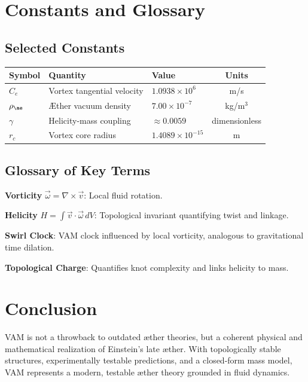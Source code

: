 \documentclass[12pt]{article}
\begin{document}
    \section{Constants and Glossary}
    \subsection{Selected Constants}
    \begin{tabular}{lllc}
        \toprule
        Symbol & Quantity & Value & Units \\
        \midrule
        $C_e$ & Vortex tangential velocity & $1.0938 \times 10^6$ & m/s \\
        $\rho_{\ae}$ & Æther vacuum density & $7.00 \times 10^{-7}$ & kg/m$^3$ \\
        $\gamma$ & Helicity-mass coupling & $\approx 0.0059$ & dimensionless \\
        $r_c$ & Vortex core radius & $1.4089 \times 10^{-15}$ & m \\
        \bottomrule
    \end{tabular}

    \subsection{Glossary of Key Terms}
    \textbf{Vorticity} \(\vec{\omega} = \nabla \times \vec{v}\): Local fluid rotation.

    \textbf{Helicity} \(H = \int \vec{v} \cdot \vec{\omega} \, dV\): Topological invariant quantifying twist and linkage.

    \textbf{Swirl Clock}: VAM clock influenced by local vorticity, analogous to gravitational time dilation.

    \textbf{Topological Charge}: Quantifies knot complexity and links helicity to mass.

    \section{Conclusion}
    VAM is not a throwback to outdated æther theories, but a coherent physical and mathematical realization of Einstein's late æther. With topologically stable structures, experimentally testable predictions, and a closed-form mass model, VAM represents a modern, testable æther theory grounded in fluid dynamics.
\end{document}
